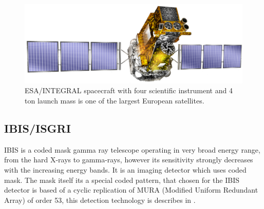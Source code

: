 \documentclass[oneside,a4paper,11pt]{report}
\begin{document}
\begin{figure}[!hbt]
\centering
\includegraphics[totalheight=4cm]{integral}
\caption{ESA/INTEGRAL spacecraft with four scientific instrument and 4 ton launch mass is one of the largest European satellites. }
\label{integral1} 
\end{figure}

\subsection{IBIS/ISGRI}
IBIS is a coded mask gamma ray telescope operating in very broad energy range, from the hard X-rays to 
gamma-rays, however its sensitivity strongly decreases with the increasing energy bands. It is an 
imaging detector which uses coded mask. The mask itself its a special coded pattern, that chosen for 
the IBIS detector is based of a cyclic replication of MURA (Modified Uniform Redundant Array) of order 
53, this detection technology is describes in \citet{mask1}.
\end{document}
